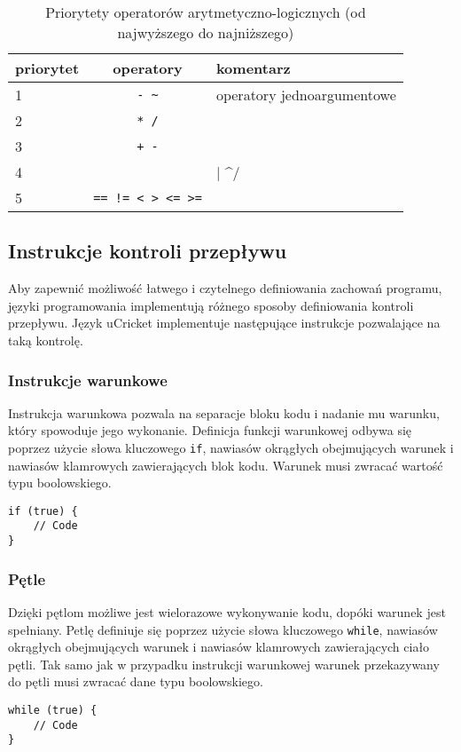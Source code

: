 \begin{table}
\centering
\caption{Priorytety operatorów arytmetyczno-logicznych (od najwyższego do najniższego)}
\begin{tabular}{lcl}
\toprule
priorytet & operatory & komentarz \\ \midrule
1 & \lstinline|- ~| & operatory jednoargumentowe \\
2 & \lstinline|* /| & \\
3 & \lstinline|+ -| & \\
4 & \lstinline/& | ^/ & \\
5 & \lstinline|== != < > <= >=| & \\ \bottomrule
\end{tabular}
\label{tbl:priorytety-operatorow}
\end{table}

\subsection{Instrukcje kontroli przepływu}
Aby zapewnić możliwość łatwego i czytelnego definiowania zachowań programu, języki programowania implementują różnego sposoby definiowania kontroli przepływu. Język uCricket implementuje następujące instrukcje pozwalające na taką kontrolę.

\subsubsection{Instrukcje warunkowe}
Instrukcja warunkowa pozwala na separacje bloku kodu i nadanie mu warunku, który spowoduje jego wykonanie. Definicja funkcji warunkowej odbywa się poprzez użycie słowa kluczowego \lstinline|if|, nawiasów okrągłych obejmujących warunek i nawiasów klamrowych zawierających blok kodu. Warunek musi zwracać wartość typu boolowskiego.
\begin{lstlisting}
if (true) {
	// Code
}
\end{lstlisting}

\subsubsection{Pętle}
Dzięki pętlom możliwe jest wielorazowe wykonywanie kodu, dopóki warunek jest spełniany. Petlę definiuje się poprzez użycie słowa kluczowego \lstinline|while|, nawiasów okrągłych obejmujących warunek i nawiasów klamrowych zawierających ciało pętli. Tak samo jak w przypadku instrukcji warunkowej  warunek przekazywany do pętli musi zwracać dane typu boolowskiego.
\begin{lstlisting}
while (true) {
	// Code
}
\end{lstlisting}
 
